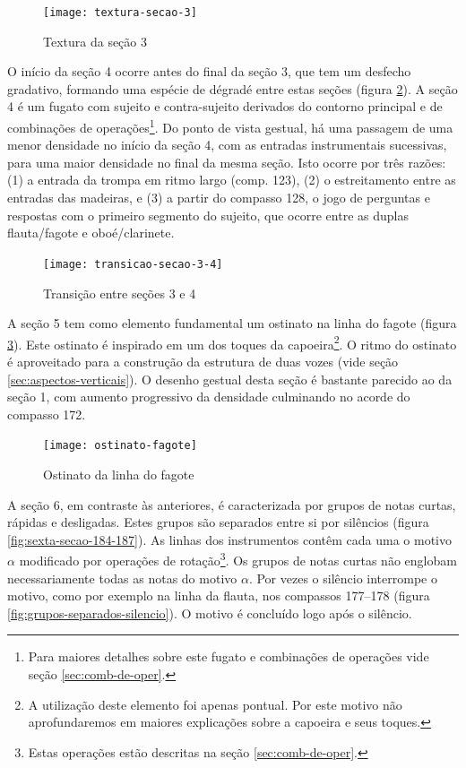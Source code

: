 \begin{figure}
  \centering
  \texttt{[image: textura-secao-3]}
  \caption{Textura da seção 3}
  \label{fig:textura-secao-3}
\end{figure}

O início da seção 4 ocorre antes do final da seção 3, que tem um
desfecho gradativo, formando uma espécie de dégradé entre estas seções
(figura \ref{fig:transicao-secao-3-4}). A seção 4 é um fugato com sujeito e
contra-sujeito derivados do contorno principal e de combinações de
operações\footnote{Para maiores detalhes sobre este fugato e
  combinações de operações vide seção \ref{sec:comb-de-oper}.}. Do
ponto de vista gestual, há uma passagem de uma menor densidade no
início da seção 4, com as entradas instrumentais sucessivas, para uma
maior densidade no final da mesma seção. Isto ocorre por três razões:
(1) a entrada da trompa em ritmo largo (comp. 123), (2) o
estreitamento entre as entradas das madeiras, e (3) a partir do
compasso 128, o jogo de perguntas e respostas com o primeiro segmento
do sujeito, que ocorre entre as duplas flauta/fagote e oboé/clarinete.

\begin{figure}
  \centering
  \texttt{[image: transicao-secao-3-4]}
  \caption{Transição entre seções 3 e 4}
  \label{fig:transicao-secao-3-4}
\end{figure}

A seção 5 tem como elemento fundamental um ostinato na linha do fagote
(figura \ref{fig:ostinato-fagote}). Este ostinato é inspirado em um
dos toques da capoeira\footnote{A utilização deste elemento foi apenas
  pontual. Por este motivo não aprofundaremos em maiores explicações
  sobre a capoeira e seus toques.}. O ritmo do ostinato é aproveitado
para a construção da estrutura de duas vozes (vide seção
\ref{sec:aspectos-verticais}). O desenho gestual desta seção é
bastante parecido ao da seção 1, com aumento progressivo da densidade
culminando no acorde do compasso 172.

\begin{figure}
  \centering
  \texttt{[image: ostinato-fagote]}
  \caption{Ostinato da linha do fagote}
  \label{fig:ostinato-fagote}
\end{figure}

A seção 6, em contraste às anteriores, é caracterizada por grupos de
notas curtas, rápidas e desligadas. Estes grupos são separados entre
si por silêncios (figura \ref{fig:sexta-secao-184-187}). As linhas dos
instrumentos contêm cada uma o motivo $\alpha$ modificado por
operações de rotação\footnote{Estas operações estão descritas na seção
  \ref{sec:comb-de-oper}.}. Os grupos de notas curtas não englobam
necessariamente todas as notas do motivo $\alpha$. Por vezes o
silêncio interrompe o motivo, como por exemplo na linha da flauta, nos
compassos 177--178 (figura \ref{fig:grupos-separados-silencio}). O
motivo é concluído logo após o silêncio.


